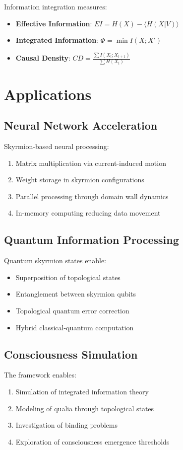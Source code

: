 \documentclass[12pt,a4paper]{article}
\begin{document}
Information integration measures:
\begin{itemize}
    \item \textbf{Effective Information}: $EI = H(X) - \langle H(X|V) \rangle$
    \item \textbf{Integrated Information}: $\Phi = \min I(X; X')$
    \item \textbf{Causal Density}: $CD = \frac{\sum I(X_t; X_{t+1})}{\sum H(X_t)}$
\end{itemize}

\section{Applications}

\subsection{Neural Network Acceleration}

Skyrmion-based neural processing:
\begin{enumerate}
    \item Matrix multiplication via current-induced motion
    \item Weight storage in skyrmion configurations
    \item Parallel processing through domain wall dynamics
    \item In-memory computing reducing data movement
\end{enumerate}

\subsection{Quantum Information Processing}

Quantum skyrmion states enable:
\begin{itemize}
    \item Superposition of topological states
    \item Entanglement between skyrmion qubits
    \item Topological quantum error correction
    \item Hybrid classical-quantum computation
\end{itemize}

\subsection{Consciousness Simulation}

The framework enables:
\begin{enumerate}
    \item Simulation of integrated information theory
    \item Modeling of qualia through topological states
    \item Investigation of binding problems
    \item Exploration of consciousness emergence thresholds
\end{enumerate}
\end{document}

